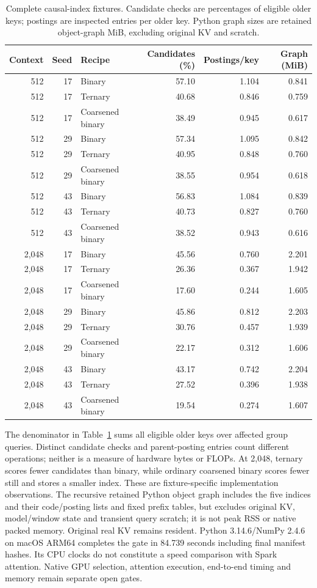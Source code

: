 \documentclass[11pt]{article}
\begin{document}
\begin{table}[ht]
\centering\small
\caption{Complete causal-index fixtures. Candidate checks are percentages of
eligible older keys; postings are inspected entries per older key. Python
graph sizes are retained object-graph MiB, excluding original KV and scratch.}
\label{tab:prefix-index}
\begin{tabular}{rrlrrr}
\toprule
Context & Seed & Recipe & Candidates (\%) & Postings/key & Graph (MiB) \\
\midrule
512 & 17 & Binary & 57.10 & 1.104 & 0.841 \\
512 & 17 & Ternary & 40.68 & 0.846 & 0.759 \\
512 & 17 & Coarsened binary & 38.49 & 0.945 & 0.617 \\
512 & 29 & Binary & 57.34 & 1.095 & 0.842 \\
512 & 29 & Ternary & 40.95 & 0.848 & 0.760 \\
512 & 29 & Coarsened binary & 38.55 & 0.954 & 0.618 \\
512 & 43 & Binary & 56.83 & 1.084 & 0.839 \\
512 & 43 & Ternary & 40.73 & 0.827 & 0.760 \\
512 & 43 & Coarsened binary & 38.52 & 0.943 & 0.616 \\
\midrule
2,048 & 17 & Binary & 45.56 & 0.760 & 2.201 \\
2,048 & 17 & Ternary & 26.36 & 0.367 & 1.942 \\
2,048 & 17 & Coarsened binary & 17.60 & 0.244 & 1.605 \\
2,048 & 29 & Binary & 45.86 & 0.812 & 2.203 \\
2,048 & 29 & Ternary & 30.76 & 0.457 & 1.939 \\
2,048 & 29 & Coarsened binary & 22.17 & 0.312 & 1.606 \\
2,048 & 43 & Binary & 43.17 & 0.742 & 2.204 \\
2,048 & 43 & Ternary & 27.52 & 0.396 & 1.938 \\
2,048 & 43 & Coarsened binary & 19.54 & 0.274 & 1.607 \\
\bottomrule
\end{tabular}
\end{table}

The denominator in Table~\ref{tab:prefix-index} sums all eligible older keys
over affected group queries. Distinct candidate checks and parent-posting
entries count different operations; neither is a measure of hardware bytes
or FLOPs. At 2,048, ternary scores fewer candidates than binary, while ordinary
coarsened binary scores fewer still and stores a smaller index. These are
fixture-specific implementation observations. The recursive retained Python
object graph includes the five indices and their code/posting lists and fixed
prefix tables, but excludes original KV, model/window state and transient
query scratch; it is not peak RSS or native packed memory. Original real KV
remains resident. Python 3.14.6/NumPy 2.4.6 on macOS ARM64 completes the gate
in 84.739 seconds including final manifest hashes. Its CPU clocks do not
constitute a speed comparison with Spark attention. Native GPU selection,
attention execution, end-to-end timing and memory remain separate open gates.
\end{document}
